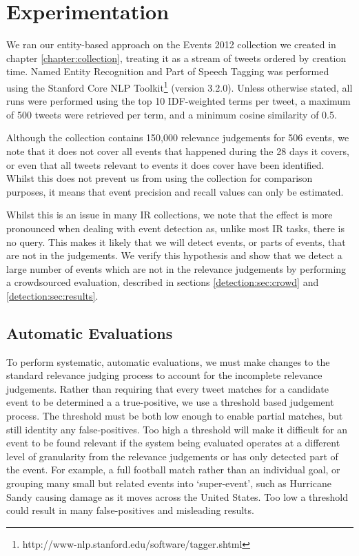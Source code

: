 
\section{Experimentation}
\label{detection:sec:experimentation}
We ran our entity-based approach on the Events 2012 collection we created in chapter \ref{chapter:collection}, treating it as a stream of tweets ordered by creation time.
Named Entity Recognition and Part of Speech Tagging was performed using the Stanford Core NLP Toolkit\footnote{http://www-nlp.stanford.edu/software/tagger.shtml} (version 3.2.0).
Unless otherwise stated, all runs were performed using the top 10 IDF-weighted terms per tweet, a maximum of 500 tweets were retrieved per term, and a minimum cosine similarity of 0.5.

Although the collection contains 150,000 relevance judgements for 506 events, we note that it does not cover all events that happened during the 28 days it covers, or even that all tweets relevant to events it does cover have been identified.
Whilst this does not prevent us from using the collection for comparison purposes, it means that event precision and recall values can only be estimated.

Whilst this is an issue in many IR collections, we note that the effect is more pronounced when dealing with event detection as, unlike most IR tasks, there is no query.
This makes it likely that we will detect events, or parts of events, that are not in the judgements.
We verify this hypothesis and show that we detect a large number of events which are not in the relevance judgements by performing a crowdsourced evaluation, described in sections \ref{detection:sec:crowd} and \ref{detection:sec:results}.

\subsection{Automatic Evaluations}
To perform systematic, automatic evaluations, we must make changes to the standard relevance judging process to account for the incomplete relevance judgements.
Rather than requiring that every tweet matches for a candidate event to be determined a a true-positive, we use a threshold based judgement process.
The threshold must be both low enough to enable partial matches, but still identity any false-positives.
Too high a threshold will make it difficult for an event to be found relevant if the system being evaluated operates at a different level of granularity from the relevance judgements or has only detected part of the event.
For example, a full football match rather than an individual goal, or grouping many small but related events into `super-event', such as Hurricane Sandy causing damage as it moves across the United States.
Too low a threshold could result in many false-positives and misleading results.

